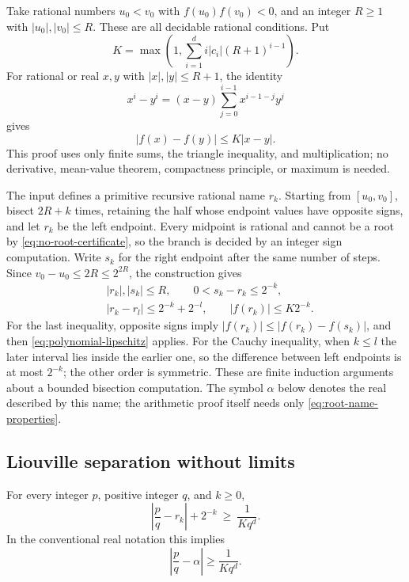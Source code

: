 Take rational numbers $u_0<v_0$ with $f(u_0)f(v_0)<0$, and an integer $R\geq1$
with $|u_0|,|v_0|\leq R$.  These are all decidable rational conditions.  Put
\begin{equation}\label{eq:roth-K}
 K=\max\left(1,\sum_{i=1}^{d} i|c_i|(R+1)^{i-1}\right).
\end{equation}
For rational or real $x,y$ with $|x|,|y|\leq R+1$, the identity
\[
 x^i-y^i=(x-y)\sum_{j=0}^{i-1}x^{i-1-j}y^j
\]
gives
\begin{equation}\label{eq:polynomial-lipschitz}
 |f(x)-f(y)|\leq K|x-y|.
\end{equation}
This proof uses only finite sums, the triangle inequality, and multiplication;
no derivative, mean-value theorem, compactness principle, or maximum is
needed.

The input defines a primitive recursive rational name $r_k$.  Starting from
$[u_0,v_0]$, bisect $2R+k$ times, retaining the half whose endpoint values
have opposite signs, and let $r_k$ be the left endpoint.  Every midpoint is
rational and cannot be a root by \eqref{eq:no-root-certificate}, so the
branch is decided by an integer sign computation.  Write $s_k$ for the right
endpoint after the same number of steps.  Since
$v_0-u_0\leq2R\leq2^{2R}$, the construction gives
\begin{equation}\label{eq:root-name-properties}
 \begin{split}
 &|r_k|,|s_k|\leq R,\qquad 0<s_k-r_k\leq2^{-k},\\
 &|r_k-r_l|\leq2^{-k}+2^{-l},\qquad |f(r_k)|\leq K2^{-k}.
 \end{split}
\end{equation}
For the last inequality, opposite signs imply
$|f(r_k)|\leq|f(r_k)-f(s_k)|$, and then
\eqref{eq:polynomial-lipschitz} applies.  For the Cauchy inequality, when
$k\leq l$ the later interval lies inside the earlier one, so the difference
between left endpoints is at most $2^{-k}$; the other order is symmetric.
These are finite induction arguments about a bounded bisection computation.
The symbol $\alpha$ below denotes the real described by this name; the
arithmetic proof itself needs only \eqref{eq:root-name-properties}.

\subsection{Liouville separation without limits}

\begin{theorem}\label{thm:liouville-explicit}
For every integer $p$, positive integer $q$, and $k\geq0$,
\begin{equation}\label{eq:finite-separation}
 \left|\frac pq-r_k\right|+2^{-k}\ \geq\ \frac1{Kq^d}.
\end{equation}
In the conventional real notation this implies
\begin{equation}\label{eq:liouville-real}
 \left|\frac pq-\alpha\right|\geq\frac1{Kq^d}.
\end{equation}
\end{theorem}

